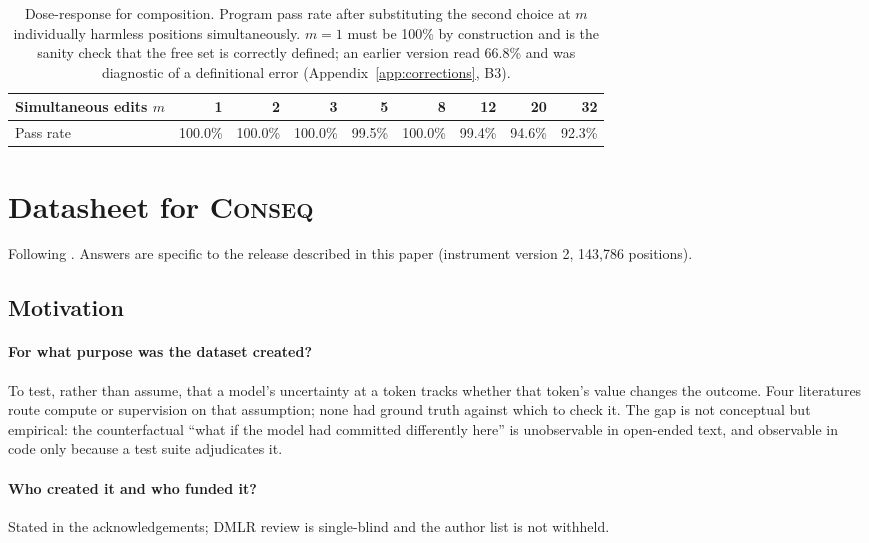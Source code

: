 \begin{table}[H]
\centering\small
\begin{tabular}{lrrrrrrrr}
\toprule
Simultaneous edits $m$ & 1 & 2 & 3 & 5 & 8 & 12 & 20 & 32 \\
\midrule
Pass rate & 100.0\% & 100.0\% & 100.0\% & 99.5\% & 100.0\% & 99.4\% & 94.6\% & 92.3\% \\
\bottomrule
\end{tabular}
\caption{Dose-response for composition. Program pass rate after substituting the second choice at $m$ individually harmless
positions simultaneously. $m=1$ must be 100\% by construction and is the sanity check that the free
set is correctly defined; an earlier version read 66.8\% and was diagnostic of a definitional error
(Appendix~\ref{app:corrections}, B3).}
\label{tab:compose}
\end{table}

\section{Datasheet for \textsc{Conseq}}
\label{app:datasheet}

Following \citet{gebru2021datasheets}. Answers are specific to the release described in this paper
(instrument version 2, 143,786 positions).

\subsection*{Motivation}

\paragraph{For what purpose was the dataset created?} To test, rather than assume, that a model's
uncertainty at a token tracks whether that token's value changes the outcome. Four literatures route
compute or supervision on that assumption; none had ground truth against which to check it. The gap
is not conceptual but empirical: the counterfactual ``what if the model had committed differently
here'' is unobservable in open-ended text, and observable in code only because a test suite
adjudicates it.

\paragraph{Who created it and who funded it?} Stated in the acknowledgements; DMLR review is
single-blind and the author list is not withheld.

